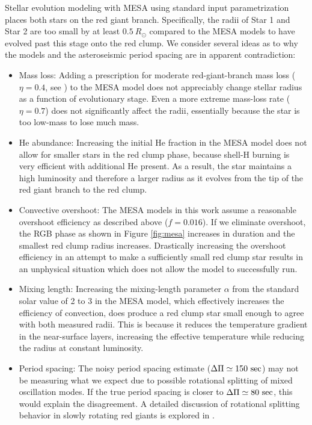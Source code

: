 Stellar evolution modeling with MESA using standard input parametrization places both stars on the red giant branch. Specifically, the radii of Star 1 and Star 2 are too small by at least $0.5 \ R_\odot$ compared to the MESA models to have evolved past this stage onto the red clump. We consider several ideas as to why the models and the asteroseismic period spacing are in apparent contradiction:
\begin{itemize}
\item Mass loss: Adding a prescription for moderate red-giant-branch mass loss ($\eta = 0.4$, see \citealt{mig12}) to the MESA model does not appreciably change stellar radius as a function of evolutionary stage. Even a more extreme mass-loss rate ($\eta = 0.7$) does not significantly affect the radii, essentially because the star is too low-mass to lose much mass.
\item He abundance: Increasing the initial He fraction in the MESA model does not allow for smaller stars in the red clump phase, because shell-H burning is very efficient with additional He present. As a result, the star maintains a high luminosity and therefore a larger radius as it evolves from the tip of the red giant branch to the red clump.
\item Convective overshoot: The MESA models in this work assume a reasonable overshoot efficiency as described above ($f = 0.016$). If we eliminate overshoot, the RGB phase as shown in Figure \ref{fig:mesa} increases in duration and the smallest red clump radius increases. Drastically increasing the overshoot efficiency in an attempt to make a sufficiently small red clump star results in an unphysical situation which does not allow the model to successfully run.
\item Mixing length: Increasing the mixing-length parameter $\alpha$ from the standard solar value of 2 to 3 in the MESA model, which effectively increases the efficiency of convection, does produce a red clump star small enough to agree with both measured radii. This is because it reduces the temperature gradient in the near-surface layers, increasing the effective temperature while reducing the radius at constant luminosity. 
\item Period spacing: The noisy period spacing estimate ($\Delta \Pi \simeq 150 \ \rm{sec}$) may not be measuring what we expect due to possible rotational splitting of mixed oscillation modes. If the true period spacing is closer to $\Delta \Pi \simeq 80 \ \rm{sec}$, this would explain the disagreement. A detailed discussion of rotational splitting behavior in slowly rotating red giants is explored in \citet{gou13}.
\end{itemize}
  
  